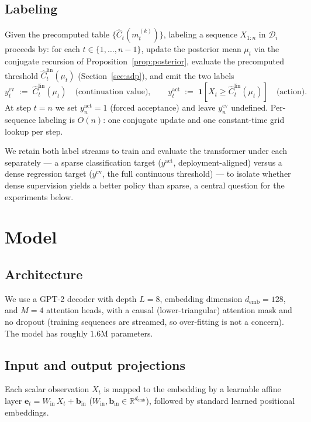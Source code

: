 \documentclass[11pt]{article}
\begin{document}
\subsection{Labeling}

Given the precomputed table $\{\widehat{C}_t(m_t^{(k)})\}$, labeling a sequence $X_{1:n}$ in $\mathcal{D}_i$ proceeds by: for each $t \in \{1,\ldots,n-1\}$, update the posterior mean $\mu_t$ via the conjugate recursion of Proposition~\ref{prop:posterior}, evaluate the precomputed threshold $\widehat{C}_t^{\mathrm{lin}}(\mu_t)$ (Section~\ref{sec:adp}), and emit the two labels
\[
y_t^{\mathrm{cv}} \;:=\; \widehat{C}_t^{\mathrm{lin}}(\mu_t)
\quad\text{(continuation value)},
\qquad
y_t^{\mathrm{act}} \;:=\; \mathbf{1}\!\left[X_t \ge \widehat{C}_t^{\mathrm{lin}}(\mu_t)\right]
\quad\text{(action)}.
\]
At step $t = n$ we set $y_n^{\mathrm{act}} = 1$ (forced acceptance) and leave $y_n^{\mathrm{cv}}$ undefined. Per-sequence labeling is $O(n)$: one conjugate update and one constant-time grid lookup per step.

We retain both label streams to train and evaluate the transformer under each separately --- a sparse classification target ($y^{\mathrm{act}}$, deployment-aligned) versus a dense regression target ($y^{\mathrm{cv}}$, the full continuous threshold) --- to isolate whether dense supervision yields a better policy than sparse, a central question for the experiments below.

\section{Model}
\label{sec:model}

\subsection{Architecture}

We use a GPT-2 decoder with depth $L = 8$, embedding dimension $d_{\mathrm{emb}} = 128$, and $M = 4$ attention heads, with a causal (lower-triangular) attention mask and no dropout (training sequences are streamed, so over-fitting is not a concern). The model has roughly $1.6$M parameters.

\subsection{Input and output projections}

Each scalar observation $X_t$ is mapped to the embedding by a learnable affine layer $\mathbf{e}_t = W_{\mathrm{in}}\, X_t + \mathbf{b}_{\mathrm{in}}$ ($W_{\mathrm{in}}, \mathbf{b}_{\mathrm{in}} \in \mathbb{R}^{d_{\mathrm{emb}}}$), followed by standard learned positional embeddings.
\end{document}
